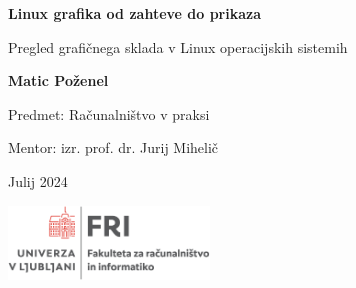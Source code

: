 \documentclass{article}
\begin{document}

\begin{titlepage}
    \begin{center}
        \vspace*{8em}

        \textbf{\Huge Linux grafika od zahteve do prikaza}

        \vspace{0.5em}

        Pregled grafičnega sklada v Linux operacijskih sistemih

        \vspace{5em}

        \textbf{\Large Matic Poženel}

        \vspace{3em}

        Predmet: Računalništvo v praksi

        Mentor: izr. prof. dr. Jurij Mihelič 

        \vspace{3em}

        Julij 2024

        \vfill
        \includegraphics[width=0.4\textwidth]{fri_logo}

        \vspace{3em}
    \end{center}
\end{titlepage}

\titlepage

\thispagestyle{empty}
\tableofcontents
\newpage
\thispagestyle{empty}
\listoffigures
\newpage
{}
\end{document}
